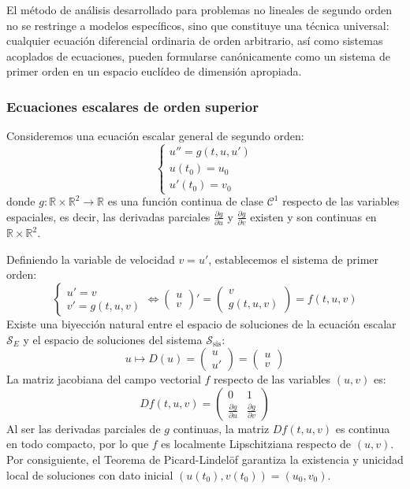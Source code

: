El método de análisis desarrollado para problemas no lineales de segundo orden no se restringe a modelos específicos, sino que constituye una técnica universal: cualquier ecuación diferencial ordinaria de orden arbitrario, así como sistemas acoplados de ecuaciones, pueden formularse canónicamente como un sistema de primer orden en un espacio euclídeo de dimensión apropiada.

\subsubsection{Ecuaciones escalares de orden superior}

Consideremos una ecuación escalar general de segundo orden:
\[
    \begin{cases}
        u'' = g(t, u, u') \\
        u(t_0) = u_0 \\
        u'(t_0) = v_0
    \end{cases}
\]
donde $g: \mathbb{R} \times \mathbb{R}^2 \to \mathbb{R}$ es una función continua de clase $\mathcal{C}^1$ respecto de las variables espaciales, es decir, las derivadas parciales $\frac{\partial g}{\partial u}$ y $\frac{\partial g}{\partial v}$ existen y son continuas en $\mathbb{R} \times \mathbb{R}^2$.

Definiendo la variable de velocidad $v = u'$, establecemos el sistema de primer orden:
\[
    \begin{cases}
        u' = v \\
        v' = g(t, u, v)
    \end{cases}
    \iff
    \begin{pmatrix} u \\ v \end{pmatrix}' = \begin{pmatrix} v \\ g(t, u, v) \end{pmatrix} = f(t, u, v)
\]
Existe una biyección natural entre el espacio de soluciones de la ecuación escalar $\mathcal{S}_E$ y el espacio de soluciones del sistema $\mathcal{S}_{\text{sis}}$:
\[
    u \longmapsto D(u) = \begin{pmatrix} u \\ u' \end{pmatrix} = \begin{pmatrix} u \\ v \end{pmatrix}
\]
La matriz jacobiana del campo vectorial $f$ respecto de las variables $(u, v)$ es:
\[
    Df(t, u, v) = \begin{pmatrix}
        0 & 1 \\
        \frac{\partial g}{\partial u} & \frac{\partial g}{\partial v}
    \end{pmatrix}
\]
Al ser las derivadas parciales de $g$ continuas, la matriz $Df(t, u, v)$ es continua en todo compacto, por lo que $f$ es localmente Lipschitziana respecto de $(u, v)$. Por consiguiente, el Teorema de Picard-Lindelöf garantiza la existencia y unicidad local de soluciones con dato inicial $(u(t_0), v(t_0)) = (u_0, v_0)$.

